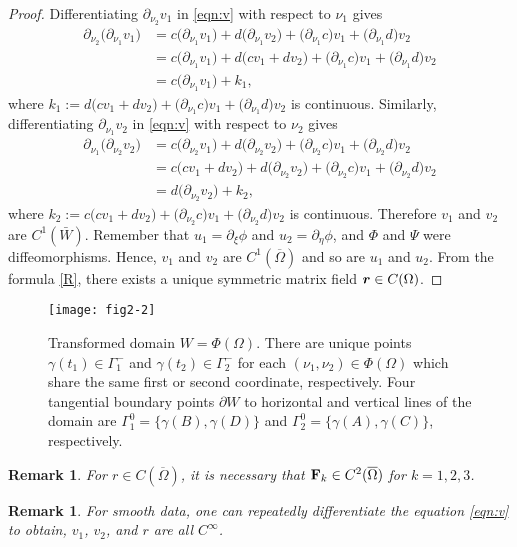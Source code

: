 \documentclass[11pt]{amsart}
\theoremstyle{plain}
\newtheorem{Rem}[Thm]{Remark}
\numberwithin{equation}{section}
\numberwithin{Thm}{section}
\def\F{{\bf F}}
\def\r{{\bf r}}
\def\r{\mbox{\boldmath$r$}}
\begin{document}
\begin{proof}
Differentiating $\partial_{\nu_2}v_1$ in \eqref{eqn:v} with respect to $\nu_1$ gives
\begin{align*}
  \partial_{\nu_2}\big(\partial_{\nu_1}v_1\big) &= c\big(\partial_{\nu_1}v_1\big) +d\big(\partial_{\nu_1}v_2\big) + \big(\partial_{\nu_1}c\big)v_1 +\big(\partial_{\nu_1}d\big)v_2  \nonumber\\
  &=c\big(\partial_{\nu_1}v_1\big) +d\big(cv_1 + d v_2) + \big(\partial_{\nu_1}c\big)v_1+\big(\partial_{\nu_1}d\big)v_2 \\
  &=c\big(\partial_{\nu_1}v_1\big) + k_1,
\end{align*}
where $k_1:=d\big(cv_1+dv_2)+\big(\partial_{\nu_1}c\big)v_1+\big(\partial_{\nu_1}d\big)v_2$ is continuous. Similarly, differentiating  $\partial_{\nu_1}v_2$ in \eqref{eqn:v} with respect to $\nu_2$ gives
\begin{align*}
 \partial_{\nu_1} \big(\partial_{\nu_2}v_2\big) &=c\big(\partial_{\nu_2}v_1\big) +d\big(\partial_{\nu_2}v_2\big) + \big(\partial_{\nu_2}c\big)v_1 +\big(\partial_{\nu_2}d\big)v_2 \nonumber\\
  &=c\big(cv_1 + d v_2) +d\big(\partial_{\nu_2}v_2\big) + \big(\partial_{\nu_2}c\big)v_1 +\big(\partial_{\nu_2}d\big)v_2\\
  &=d\big(\partial_{\nu_2}v_2\big) + k_2,
\end{align*}
where $k_2:=c\big(cv_1 + d v_2) +\big(\partial_{\nu_2}c\big)v_1 +\big(\partial_{\nu_2}d\big)v_2$ is continuous. Therefore $v_1$ and $v_2$ are $C^1(\bar W)$. Remember that $u_1=\partial_\xi\phi$ and $u_2=\partial_\eta\phi$, and $\Phi$ and $\Psi$ were diffeomorphisms. Hence, $v_1$ and $v_2$ are $C^1(\overline\Omega)$ and so are $u_1$ and $u_2$. From the formula \eqref{R}, there exists a unique symmetric matrix field $\r\in C(\Omega)$.
\end{proof}
\begin{figure}
  \center
  \texttt{[image: fig2-2]}
  \caption{Transformed domain $W=\Phi(\Omega)$. There are unique points $\gamma(t_1) \in \Gamma_1^-$ and $\gamma(t_2) \in \Gamma_2^-$ for each $(\nu_1,\nu_2)\in\Phi(\Omega)$ which share the same first or second coordinate, respectively. Four tangential boundary points $\partial W$ to horizontal and vertical lines of the domain are $\Gamma_1^0=\{\gamma(B), \gamma(D)\}$ and $\Gamma_2^0=\{\gamma(A), \gamma(C)\}$, respectively.} \label{fig2}
\end{figure}
\begin{Rem}
For $r\in C(\overline\Omega)$, it is necessary that $\F_k \in C^2(\overline\Omega)$ for $k=1,2,3$.
\end{Rem}
\begin{Rem}
For smooth data, one can repeatedly differentiate the equation \eqref{eqn:v} to obtain, $v_1$, $v_2$, and $r$ are all $C^\infty$.
\end{Rem}
\end{document}
